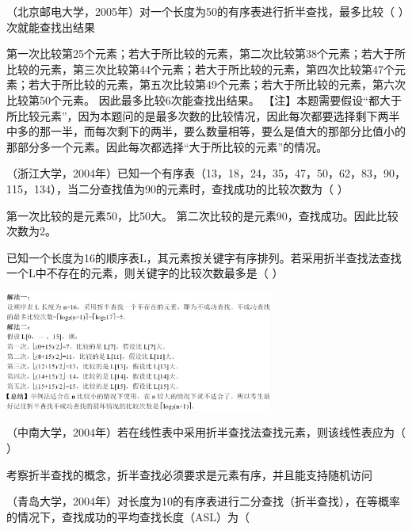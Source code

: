 \question （北京邮电大学，2005年）对一个长度为50的有序表进行折半查找，最多比较（
）次就能查找出结果
\par{}
\begin{solution}第一次比较第25个元素；若大于所比较的元素，第二次比较第38个元素；若大于所比较的元素，第三次比较第44个元素；若大于所比较的元素，第四次比较第47个元素；若大于所比较的元素，第五次比较第49个元素；若大于所比较的元素，第六次比较第50个元素。
因此最多比较6次能查找出结果。
【注】本题需要假设``都大于所比较元素''，因为本题问的是最多次数的比较情况，因此每次都要选择剩下两半中多的那一半，而每次剩下的两半，要么数量相等，要么是值大的那部分比值小的那部分多一个元素。因此每次都选择``大于所比较的元素''的情况。
\end{solution}
\question （浙江大学，2004年）已知一个有序表（13，18，24，35，47，50，62，83，90，115，134），当二分查找值为90的元素时，查找成功的比较次数为（
）
\par{}
\begin{solution}第一次比较的是元素50，比50大。
第二次比较的是元素90，查找成功。因此比较次数为2。
\end{solution}
\question 已知一个长度为16的顺序表L，其元素按关键字有序排列。若采用折半查找法查找一个L中不存在的元素，则关键字的比较次数最多是（
）
\par{}
\begin{solution}\includegraphics[width=3.46875in,height=1.55208in]{computerassets/FF39BAA734C32BA5A7D30035B50F1E93.png}
\end{solution}
\question （中南大学，2004年）若在线性表中采用折半查找法查找元素，则该线性表应为（
）
\par{}
\begin{solution}考察折半查找的概念，折半查找必须要求是元素有序，并且能支持随机访问
\end{solution}
\question （青岛大学，2004年）对长度为10的有序表进行二分查找（折半查找），在等概率的情况下，查找成功的平均查找长度（ASL）为（
